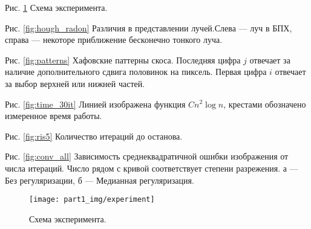 % 
% 
% 
% 
% 

\newpage

Рис. \ref{fig:experiment} Схема эксперимента.

Рис. \ref{fig:hough_radon} Различия в представлении лучей.Слева --- луч в БПХ, справа --- некоторе приближение бесконечно тонкого луча.

Рис. \ref{fig:patterns} Хафовские паттерны скоса.
Последняя цифра $j$ отвечает за наличие  дополнительного сдвига половинок на пиксель. Первая цифра $i$ отвечает за выбор верхней или нижней частей.

Рис. \ref{fig:time_30it} Линией изображена функция $Cn^2\log n$, крестами обозначено измеренное время работы.

Рис. \ref{fig:ris5} Количество итераций до останова.

Рис. \ref{fig:conv_all} Зависимость среднеквадратичной ошибки изображения от числа итераций.
Число рядом с кривой соответствует степени разрежения. а --- Без регуляризации, б --- Медианная регуляризация.

\newpage
\begin{figure}[h!]
  \centering
  \texttt{[image: part1\_img/experiment]}
  \caption{Схема эксперимента.}
  \label{fig:experiment}
\end{figure}

